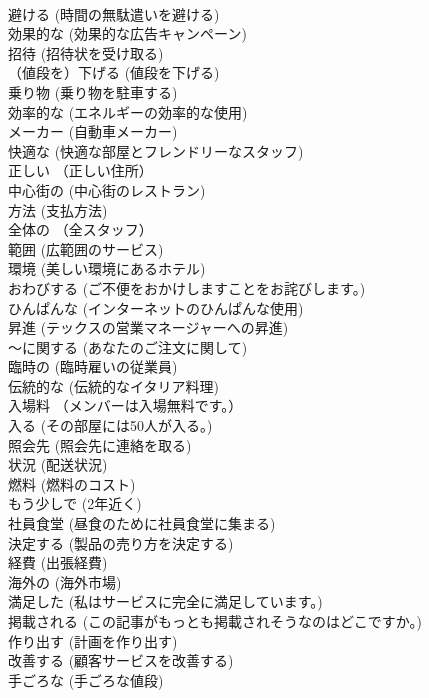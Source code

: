 \documentclass[8pt]{extreport}
\begin{document}
\begin{CJK}{UTF8}{min}
\\	避ける	(時間の無駄遣いを避ける)		
\\	効果的な	(効果的な広告キャンペーン)		
\\	招待	(招待状を受け取る)		
\\	（値段を）下げる	(値段を下げる)		
\\	乗り物	(乗り物を駐車する)		
\\	効率的な	(エネルギーの効率的な使用)		
\\	メーカー	(自動車メーカー)		
\\	快適な	(快適な部屋とフレンドリーなスタッフ)		
\\	正しい	（正しい住所）		
\\	中心街の	(中心街のレストラン)		
\\	方法	(支払方法)		
\\	全体の	（全スタッフ）		
\\	範囲	(広範囲のサービス)		
\\	環境	(美しい環境にあるホテル)		
\\	おわびする	(ご不便をおかけしますことをお詫びします。)		
\\	ひんぱんな	(インターネットのひんぱんな使用)		
\\	昇進	(テックスの営業マネージャーへの昇進)		
\\	～に関する	(あなたのご注文に関して)		
\\	臨時の	(臨時雇いの従業員)		
\\	伝統的な	(伝統的なイタリア料理)		
\\	入場料	（メンバーは入場無料です。）		
\\	入る	(その部屋には50人が入る。)		
\\	照会先	(照会先に連絡を取る)		
\\	状況	(配送状況)		
\\	燃料	(燃料のコスト)		
\\	もう少しで	(2年近く)		
\\	社員食堂	(昼食のために社員食堂に集まる)		
\\	決定する	(製品の売り方を決定する)		
\\	経費	(出張経費)		
\\	海外の	(海外市場)		
\\	満足した	(私はサービスに完全に満足しています。)		
\\	掲載される	(この記事がもっとも掲載されそうなのはどこですか。)		
\\	作り出す	(計画を作り出す)		
\\	改善する	(顧客サービスを改善する)		
\\	手ごろな	(手ごろな値段)		

\end{CJK}
\end{document}
